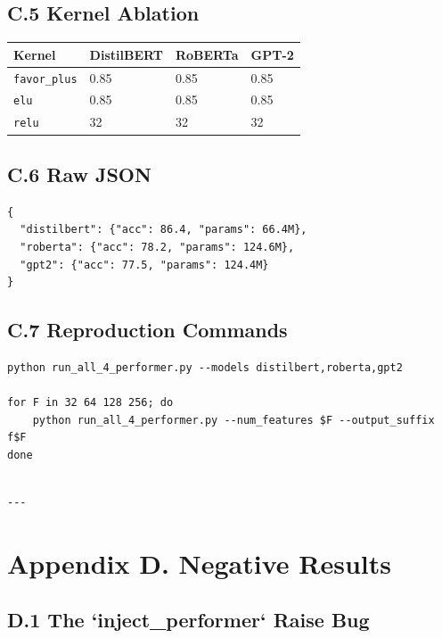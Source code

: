 \subsection{C.5 Kernel Ablation}

\begin{table}[H]
\centering
\small
\begin{tabular}{llll}
\toprule
\textbf{Kernel} & \textbf{DistilBERT} & \textbf{RoBERTa} & \textbf{GPT-2} \\
\midrule
\texttt{favor\_plus} & 0.85 & 0.85 & 0.85 \\
\texttt{elu} & 0.85 & 0.85 & 0.85 \\
\texttt{relu} & 32 & 32 & 32 \\
\bottomrule
\end{tabular}
\end{table}

\subsection{C.6 Raw JSON}

\begin{lstlisting}
{
  "distilbert": {"acc": 86.4, "params": 66.4M},
  "roberta": {"acc": 78.2, "params": 124.6M},
  "gpt2": {"acc": 77.5, "params": 124.4M}
}
\end{lstlisting}

\subsection{C.7 Reproduction Commands}

\begin{lstlisting}
python run_all_4_performer.py --models distilbert,roberta,gpt2

for F in 32 64 128 256; do
    python run_all_4_performer.py --num_features $F --output_suffix f$F
done
\end{lstlisting}
\begin{lstlisting}

---
\end{lstlisting}


\section{Appendix D. Negative Results}

\subsection{D.1 The `inject\_performer` Raise Bug}

